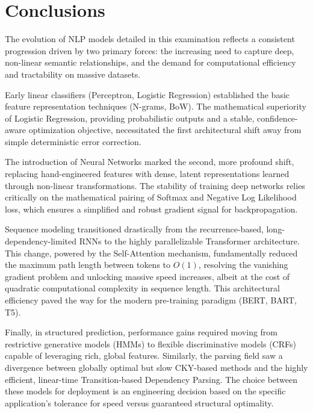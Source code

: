 \documentclass{article}
\begin{document}
\section{Conclusions}

The evolution of NLP models detailed in this examination reflects a consistent progression driven by two primary forces: the increasing need to capture deep, non-linear semantic relationships, and the demand for computational efficiency and tractability on massive datasets.

Early linear classifiers (Perceptron, Logistic Regression) established the basic feature representation techniques (N-grams, BoW). The mathematical superiority of Logistic Regression, providing probabilistic outputs and a stable, confidence-aware optimization objective, necessitated the first architectural shift away from simple deterministic error correction.

The introduction of Neural Networks marked the second, more profound shift, replacing hand-engineered features with dense, latent representations learned through non-linear transformations. The stability of training deep networks relies critically on the mathematical pairing of Softmax and Negative Log Likelihood loss, which ensures a simplified and robust gradient signal for backpropagation.

Sequence modeling transitioned drastically from the recurrence-based, long-dependency-limited RNNs to the highly parallelizable Transformer architecture. This change, powered by the Self-Attention mechanism, fundamentally reduced the maximum path length between tokens to $O(1)$, resolving the vanishing gradient problem and unlocking massive speed increases, albeit at the cost of quadratic computational complexity in sequence length. This architectural efficiency paved the way for the modern pre-training paradigm (BERT, BART, T5).

Finally, in structured prediction, performance gains required moving from restrictive generative models (HMMs) to flexible discriminative models (CRFs) capable of leveraging rich, global features. Similarly, the parsing field saw a divergence between globally optimal but slow CKY-based methods and the highly efficient, linear-time Transition-based Dependency Parsing. The choice between these models for deployment is an engineering decision based on the specific application's tolerance for speed versus guaranteed structural optimality.
\end{document}
